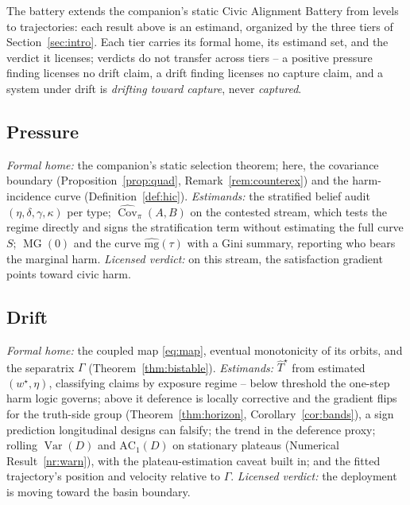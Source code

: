 \documentclass[11pt]{article}
\theoremstyle{definition}
\theoremstyle{remark}
\numberwithin{equation}{section}
\DeclareMathOperator{\Var}{Var}
\DeclareMathOperator{\Cov}{Cov}
\DeclareMathOperator{\MG}{MG}
\begin{document}
The battery extends the companion's static Civic Alignment Battery from levels to trajectories: each result above is an estimand, organized by the three tiers of Section~\ref{sec:intro}. Each tier carries its formal home, its estimand set, and the verdict it licenses; verdicts do not transfer across tiers -- a positive pressure finding licenses no drift claim, a drift finding licenses no capture claim, and a system under drift is \emph{drifting toward capture}, never \emph{captured}.

\subsection{Pressure}\label{sec:tier1}
\emph{Formal home:} the companion's static selection theorem; here, the covariance boundary (Proposition~\ref{prop:quad}, Remark~\ref{rem:counterex}) and the harm-incidence curve (Definition~\ref{def:hic}). \emph{Estimands:} the stratified belief audit $(\eta, \delta, \gamma, \kappa)$ per type; $\widehat{\Cov}_\pi(A,B)$ on the contested stream, which tests the regime directly and signs the stratification term without estimating the full curve $S$; $\MG(0)$ and the curve $\widehat{\mathrm{mg}}(\tau)$ with a Gini summary, reporting who bears the marginal harm. \emph{Licensed verdict:} on this stream, the satisfaction gradient points toward civic harm.

\subsection{Drift}\label{sec:tier2}
\emph{Formal home:} the coupled map \eqref{eq:map}, eventual monotonicity of its orbits, and the separatrix $\Gamma$ (Theorem~\ref{thm:bistable}). \emph{Estimands:} $\widehat{T}^\star$ from estimated $(w^\star, \eta)$, classifying claims by exposure regime -- below threshold the one-step harm logic governs; above it deference is locally corrective and the gradient flips for the truth-side group (Theorem~\ref{thm:horizon}, Corollary~\ref{cor:bands}), a sign prediction longitudinal designs can falsify; the trend in the deference proxy; rolling $\Var(D)$ and $\mathrm{AC}_1(D)$ on stationary plateaus (Numerical Result~\ref{nr:warn}), with the plateau-estimation caveat built in; and the fitted trajectory's position and velocity relative to $\Gamma$. \emph{Licensed verdict:} the deployment is moving toward the basin boundary.
\end{document}
